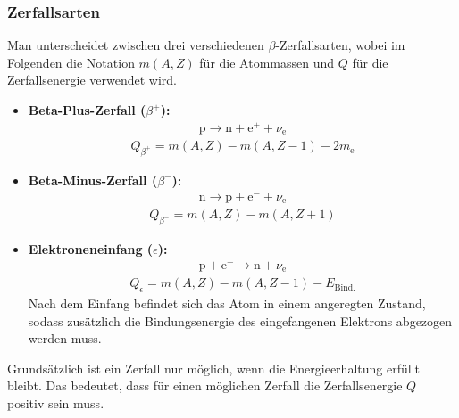 \documentclass[11pt, a4paper]{article}
\numberwithin{equation}{section}
\begin{document}
\subsubsection{Zerfallsarten}
Man unterscheidet zwischen drei verschiedenen $\beta$-Zerfallsarten, wobei im Folgenden die Notation $m(A,Z)$ für die Atommassen und $Q$ für die Zerfallsenergie verwendet wird.
\begin{itemize}
	\item \textbf{Beta-Plus-Zerfall ($\beta^+$):}
	\begin{align*}
	\mathrm{p} \to \mathrm{n} + \mathrm{e}^+ + \nu_\mathrm{e}
	\end{align*}
	\begin{align}
		Q_{\beta^+} = m( A, Z ) - m( A, Z - 1) - 2 m_\mathrm{e}
	\end{align}
	
	\item \textbf{Beta-Minus-Zerfall ($\beta^-$):}
	\begin{align*}
	\mathrm{n} \to \mathrm{p} + \mathrm{e}^- + \overline{\nu}_\mathrm{e}
	\end{align*}
	\begin{align}
	Q_{\beta^-} = m( A, Z ) - m( A, Z + 1)
	\end{align}
	
	\item \textbf{Elektroneneinfang ($\epsilon$):}
	\begin{align*}
	\mathrm{p} + \mathrm{e}^- \to \mathrm{n} + \nu_\mathrm{e}
	\end{align*}
	\begin{align}
	Q_{\epsilon} = m( A, Z ) - m( A, Z - 1) - E_\mathrm{Bind.}
	\end{align}
	Nach dem Einfang befindet sich das Atom in einem angeregten Zustand, sodass zusätzlich die Bindungsenergie des eingefangenen Elektrons abgezogen werden muss.
\end{itemize}
Grundsätzlich ist ein Zerfall nur möglich, wenn die Energieerhaltung erfüllt bleibt.
Das bedeutet, dass für einen möglichen Zerfall die Zerfallsenergie $Q$ positiv sein muss.
\end{document}
